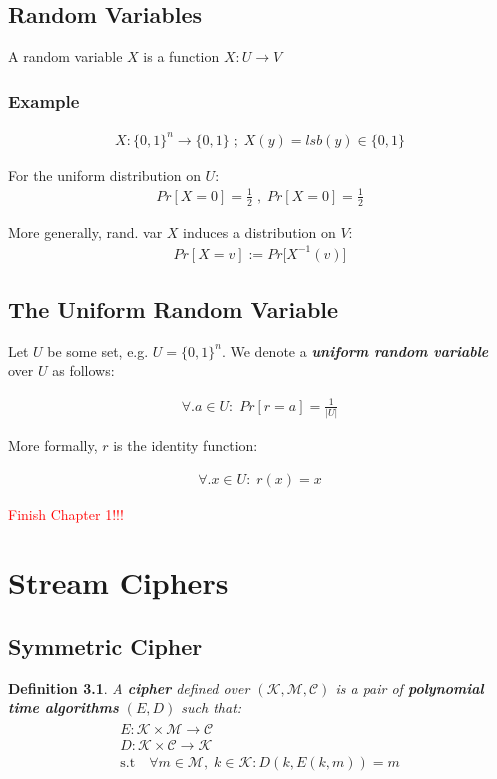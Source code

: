 \documentclass[11pt,a4paper]{report}
\newcommand\todo[1]{\noindent\textcolor{red}{#1}}
\newtheorem{definition}{Definition}
\begin{document}
\section{Random Variables}
A random variable $X$ is a function $X : U \rightarrow V$

\subsection{Example}
\begin{gather*}
X : \{ 0,1 \}^n \rightarrow \{ 0,1 \} \; ; \; X(y) = lsb(y) \in \{0,1\}
\end{gather*}

\noindent
For the uniform distribution on $U$:
\begin{gather*}
	Pr [X=0] = \frac{1}{2} \; , \; Pr [X=0] = \frac{1}{2}
\end{gather*}

\noindent
More generally, rand. var $X$ induces a distribution on $V$: 
\begin{gather*}
	Pr [X=v] := Pr \big[ X^{-1}(v) \big]
\end{gather*}

\section{The Uniform Random Variable}
Let $U$ be some set, e.g. $U = \{0,1\}^n$. We denote a \emph{\textbf{uniform random variable}} over $U$ as follows: 

\begin{gather*}
	\forall.a \in U : \; Pr [r = a] = \frac{1}{|U|}
\end{gather*}

\noindent
More formally, $r$ is the identity function: 

\begin{gather*}
	\forall.x \in U : \; r(x) = x
\end{gather*}

\todo{Finish Chapter 1!!!}

\chapter{Stream Ciphers}
\section{Symmetric Cipher}
\begin{definition}
A \textbf{cipher} defined over $( \mathscr{K,M,C} )$ is a pair of \textbf{polynomial time algorithms} $(E,D)$ such that:
\begin{gather}
	\begin{gathered}
		E : \mathscr{K} \times \mathscr{M} \rightarrow \mathscr{C} \\
		D : \mathscr{K} \times \mathscr{C} \rightarrow \mathscr{K} \\
		\textrm{s.t} \quad \forall m \in \mathscr{M},\; k \in \mathscr{K} : D(k, E(k, m)) = m
	\end{gathered}
\end{gather}
\end{definition}
\end{document}

